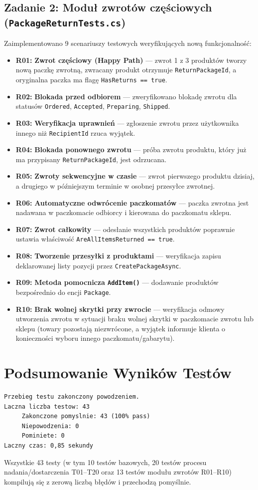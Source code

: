 \documentclass[10.5pt,a4paper]{article}
\begin{document}
\subsection{Zadanie 2: Moduł zwrotów częściowych (\texttt{PackageReturnTests.cs})}
Zaimplementowano 9 scenariuszy testowych weryfikujących nową funkcjonalność:
\begin{itemize}[leftmargin=*,itemsep=1.5pt]
    \item \textbf{R01:} \textbf{Zwrot częściowy (Happy Path)} --- zwrot 1 z 3 produktów tworzy nową paczkę zwrotną, zwracany produkt otrzymuje \texttt{ReturnPackageId}, a oryginalna paczka ma flagę \texttt{HasReturns == true}.
    \item \textbf{R02:} \textbf{Blokada przed odbiorem} --- zweryfikowano blokadę zwrotu dla statusów \texttt{Ordered}, \texttt{Accepted}, \texttt{Preparing}, \texttt{Shipped}.
    \item \textbf{R03:} \textbf{Weryfikacja uprawnień} --- zgłoszenie zwrotu przez użytkownika innego niż \texttt{RecipientId} rzuca wyjątek.
    \item \textbf{R04:} \textbf{Blokada ponownego zwrotu} --- próba zwrotu produktu, który już ma przypisany \texttt{ReturnPackageId}, jest odrzucana.
    \item \textbf{R05:} \textbf{Zwroty sekwencyjne w czasie} --- zwrot pierwszego produktu dzisiaj, a drugiego w późniejszym terminie w osobnej przesyłce zwrotnej.
    \item \textbf{R06:} \textbf{Automatyczne odwrócenie paczkomatów} --- paczka zwrotna jest nadawana w paczkomacie odbiorcy i kierowana do paczkomatu sklepu.
    \item \textbf{R07:} \textbf{Zwrot całkowity} --- odesłanie wszystkich produktów poprawnie ustawia właściwość \texttt{AreAllItemsReturned == true}.
    \item \textbf{R08:} \textbf{Tworzenie przesyłki z produktami} --- weryfikacja zapisu deklarowanej listy pozycji przez \texttt{CreatePackageAsync}.
    \item \textbf{R09:} \textbf{Metoda pomocnicza \texttt{AddItem()}} --- dodawanie produktów bezpośrednio do encji \texttt{Package}.
    \item \textbf{R10:} \textbf{Brak wolnej skrytki przy zwrocie} --- weryfikacja odmowy utworzenia zwrotu w sytuacji braku wolnej skrytki w paczkomacie zwrotu lub sklepu (towary pozostają niezwrócone, a wyjątek informuje klienta o konieczności wyboru innego paczkomatu/gabarytu).
\end{itemize}

\section{Podsumowanie Wyników Testów}

\begin{lstlisting}
Przebieg testu zakonczony powodzeniem.
Laczna liczba testow: 43
     Zakonczone pomyslnie: 43 (100% pass)
     Niepowodzenia: 0
     Pominiete: 0
Laczny czas: 0,85 sekundy
\end{lstlisting}

Wszystkie 43 testy (w tym 10 testów bazowych, 20 testów procesu nadania/dostarczenia T01--T20 oraz 13 testów modułu zwrotów R01--R10) kompilują się z zerową liczbą błędów i przechodzą pomyślnie.
\end{document}
